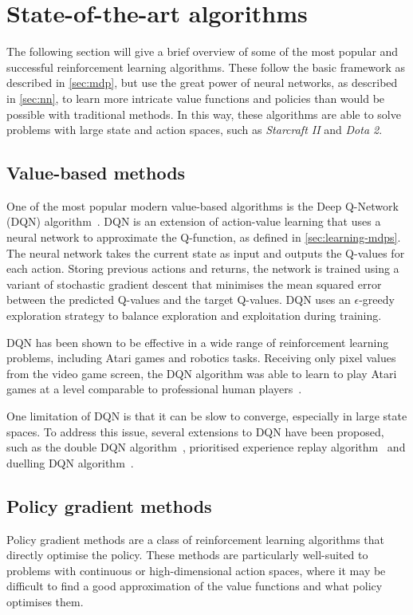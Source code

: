 \section{State-of-the-art algorithms}
\label{sec:rl_algs}
The following section will give a brief overview of some of the most popular and successful reinforcement learning algorithms.
These follow the basic framework as described in \cref{sec:mdp}, but use the great power of neural networks, as described in \cref{sec:nn}, to learn more intricate value functions and policies than would be possible with traditional methods.
In this way, these algorithms are able to solve problems with large state and action spaces, such as \textit{Starcraft II} and \textit{Dota 2}.

\subsection{Value-based methods}
One of the most popular modern value-based algorithms is the Deep Q-Network (DQN) algorithm~\autocite{mnih2013}.
DQN is an extension of action-value learning that uses a neural network to approximate the Q-function, as defined in \cref{sec:learning-mdps}.
The neural network takes the current state as input and outputs the Q-values for each action.
Storing previous actions and returns, the network is trained using a variant of stochastic gradient descent that minimises the mean squared error between the predicted Q-values and the target Q-values.
DQN uses an $\epsilon$-greedy exploration strategy to balance exploration and exploitation during training.

DQN has been shown to be effective in a wide range of reinforcement learning problems, including Atari games and robotics tasks.
Receiving only pixel values from the video game screen, the DQN algorithm was able to learn to play Atari games at a level comparable to professional human players~\autocite{mnih2015}.

One limitation of DQN is that it can be slow to converge, especially in large state spaces.
To address this issue, several extensions to DQN have been proposed, such as the double DQN algorithm~\autocite{hasselt2016}, prioritised experience replay algorithm~\autocite{schaul2015} and duelling DQN algorithm~\autocite{wang2016}.

\subsection{Policy gradient methods}
Policy gradient methods are a class of reinforcement learning algorithms that directly optimise the policy.
These methods are particularly well-suited to problems with continuous or high-dimensional action spaces, where it may be difficult to find a good approximation of the value functions and what policy optimises them.

